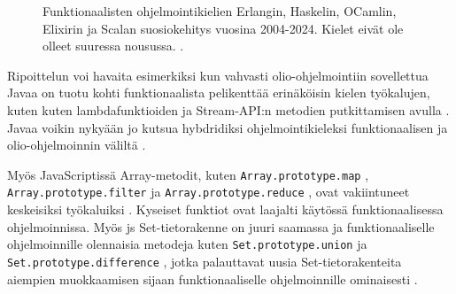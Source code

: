 \begin{figure}[htbp]
    \datatable
    \pgfplotstablegetrowsof{\datatable}
    \centering
    \caption{Funktionaalisten ohjelmointikielien Erlangin, Haskelin, OCamlin, Elixirin ja Scalan suosiokehitys vuosina 2004-2024. Kielet eivät ole olleet suuressa nousussa. \cite{fplanggoogletrend}.}
    \label{fig:fplangpopularity}
\end{figure}


Ripoittelun voi havaita esimerkiksi kun vahvasti olio-ohjelmointiin sovellettua Javaa on tuotu kohti funktionaalista pelikenttää erinäköisin kielen työkalujen, kuten kuten lambdafunktioiden ja Stream-API:n metodien putkittamisen avulla \cite{oracle_function_package,oracle_stream_api} .
Javaa voikin nykyään jo kutsua hybdridiksi ohjelmointikieleksi funktionaalisen ja olio-ohjelmoinnin väliltä \cite[50]{sundstrom_java_fp}.

Myös JavaScriptissä Array-metodit, kuten \texttt{Array.prototype.map} \cite{mdn_array_map}, \texttt{Array.prototype.filter} \cite{mdn_array_filter} ja \texttt{Array.prototype.reduce} \cite{mdn_array_reduce}, ovat vakiintuneet keskeisiksi työkaluiksi \cite{vakil2016,8_must_know_array_methods}. Kyseiset funktiot ovat laajalti käytössä funktionaalisessa ohjelmoinnissa. Myös \gls{js} Set-tietorakenne on juuri saamassa  ja funktionaaliselle ohjelmoinnille olennaisia metodeja kuten \texttt{Set.prototype.union} \cite{mdn_set_union} ja \texttt{Set.prototype.difference} \cite{mdn_set_intersection}, jotka palauttavat uusia Set-tietorakenteita aiempien muokkaamisen sijaan funktionaaliselle ohjelmoinnille ominaisesti \cite{mdn_set_methods}.

